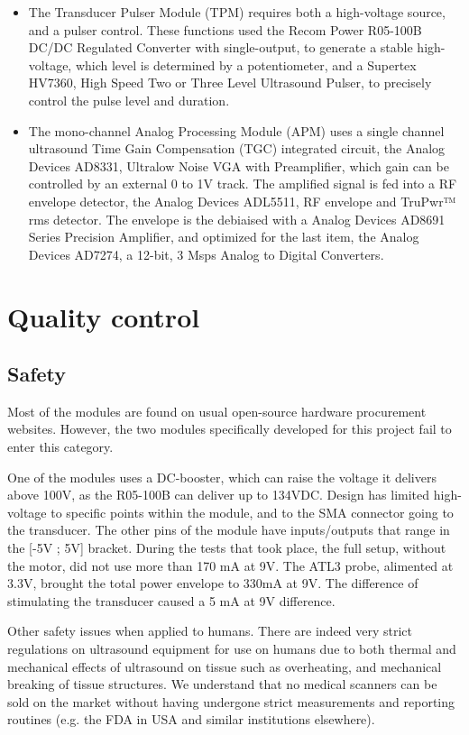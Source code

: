 \documentclass[letterpaper, 10 pt, conference]{ieeeconf} %
\begin{document}
\begin{itemize}
\item The Transducer Pulser Module (TPM) requires both a high-voltage source, and a pulser control. These functions used the Recom Power R05-100B DC/DC Regulated Converter with single-output, to generate a stable high-voltage, which level is determined by a potentiometer, and a Supertex HV7360, High Speed Two or Three Level Ultrasound Pulser, to precisely control the pulse level and duration.
\item The mono-channel Analog Processing Module (APM) uses a single channel ultrasound Time Gain Compensation (TGC) integrated circuit, the Analog Devices AD8331, Ultralow Noise VGA with Preamplifier, which gain can be controlled by an external 0 to 1V track. The amplified signal is fed into a RF envelope detector, the Analog Devices ADL5511, RF envelope and TruPwr™ rms detector. The envelope is the debiaised with a Analog Devices AD8691 Series Precision Amplifier, and optimized for the last item, the  Analog Devices AD7274, a 12-bit, 3 Msps Analog to Digital Converters.
\end{itemize}

\section{Quality control}

\subsection{Safety}
Most of the modules are found on usual open-source hardware procurement websites. However, the two modules specifically developed for this project fail to enter this category.

One of the modules uses a DC-booster, which can raise the voltage it delivers above 100V, as the R05-100B can deliver up to 134VDC. Design has limited high-voltage to specific points within the module, and to the SMA connector going to the transducer. The other pins of the module have inputs/outputs that range in the [-5V ; 5V] bracket. During the tests that took place, the full setup, without the motor, did not use more than 170 mA at 9V. The ATL3 probe, alimented at 3.3V, brought the total power envelope to 330mA at 9V. The difference of stimulating the transducer caused a 5 mA at 9V difference.

Other safety issues when applied to humans\cite{SafeUse}. There are indeed very strict regulations on ultrasound equipment for use on humans due to both thermal and mechanical effects of ultrasound on tissue such as overheating, and mechanical breaking of tissue structures. We understand that no medical scanners can be sold on the market without having undergone strict measurements and reporting routines (e.g. the FDA in USA and similar institutions elsewhere). 
\end{document}
